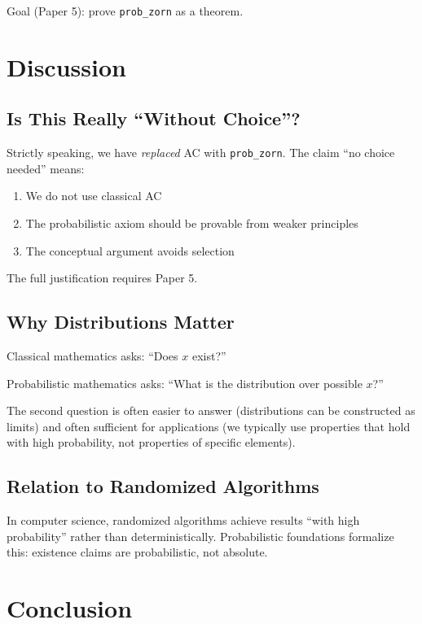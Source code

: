 \documentclass[11pt,a4paper]{article}
\begin{document}
Goal (Paper 5): prove \texttt{prob\_zorn} as a theorem.

\section{Discussion}

\subsection{Is This Really ``Without Choice''?}

Strictly speaking, we have \emph{replaced} AC with \texttt{prob\_zorn}. The claim ``no choice needed'' means:

\begin{enumerate}
    \item We do not use classical AC
    \item The probabilistic axiom should be provable from weaker principles
    \item The conceptual argument avoids selection
\end{enumerate}

The full justification requires Paper 5.

\subsection{Why Distributions Matter}

Classical mathematics asks: ``Does $x$ exist?''

Probabilistic mathematics asks: ``What is the distribution over possible $x$?''

The second question is often easier to answer (distributions can be constructed as limits) and often sufficient for applications (we typically use properties that hold with high probability, not properties of specific elements).

\subsection{Relation to Randomized Algorithms}

In computer science, randomized algorithms achieve results ``with high probability'' rather than deterministically. Probabilistic foundations formalize this: existence claims are probabilistic, not absolute.

\section{Conclusion}
\end{document}

